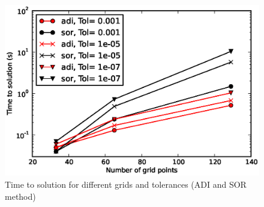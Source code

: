 %
\begin{figure}[H]
\centering
\includegraphics[scale=0.8]{"figs/timings_adi_sor"}
\caption{Time to solution for different grids and tolerances (ADI and SOR method)}
\label{fig:comp_time}
\end{figure}
%
